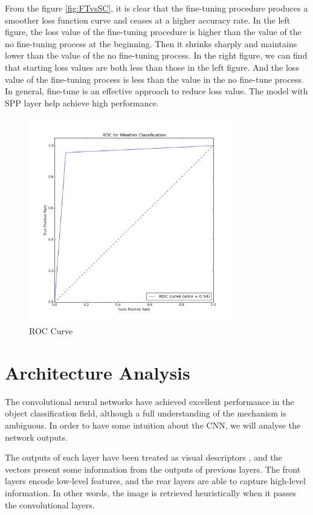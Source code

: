 From the figure \ref{fig:FTvsSC}, it is clear that the fine-tuning procedure produces a smoother loss function curve and ceases at a higher accuracy rate. In the left figure, the loss value of the fine-tuning procedure is higher than the value of the no fine-tuning process at the beginning. Then it shrinks sharply and maintains lower than the value of the no fine-tuning process. In the right figure, we can find that starting loss values are both less than those in the left figure. And the loss value of the fine-tuning process is less than the value in the no fine-tune process. In general, fine-tune is an effective approach to reduce loss value. The model with SPP layer help achieve high performance.

\begin{figure}[!htb]
    \centering
	\includegraphics[width=0.8\textwidth]{ROCWeatherClassification.png}
    \caption{ROC Curve}%
    \label{fig:WeatherClassificationROC}%
\end{figure}

\section{Architecture Analysis}

The convolutional neural networks have achieved excellent performance in the object classification field, although a full understanding of the mechanism is ambiguous. In order to have some intuition about the CNN, we will analyse the network outputs.

The outputs of each layer have been treated as visual descriptors \citep{razavian2014cnn}, and the vectors present some information from the outputs of previous layers. The front layers encode low-level features, and the rear layers are able to capture high-level information. In other words, the image is retrieved heuristically when it passes the convolutional layers.

